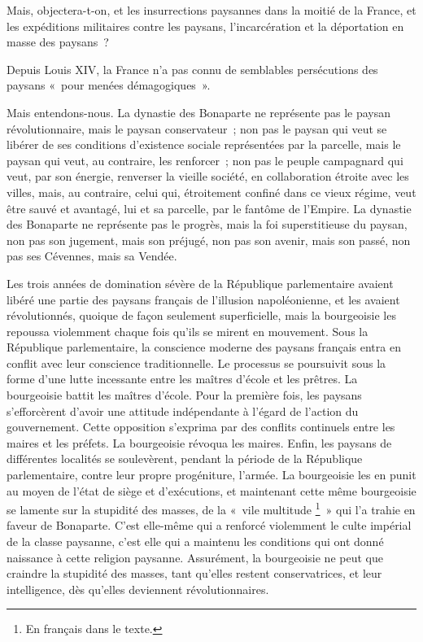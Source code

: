\documentclass[french,twoside]{book} %
\begin{document}
Mais, objectera-t-on, et les insurrections paysannes dans la moitié de la France, et les expéditions militaires contre les paysans, l’incarcération et la déportation en masse des paysans ?\par
Depuis Louis XIV, la France n’a pas connu de semblables persécutions des paysans « pour menées démagogiques ».\par
Mais entendons-nous. La dynastie des Bonaparte ne représente pas le paysan révolutionnaire, mais le paysan conservateur ; non pas le paysan qui veut se libérer de ses conditions d’existence sociale représentées par la parcelle, mais le paysan qui veut, au contraire, les renforcer ; non pas le peuple campagnard qui veut, par son énergie, renverser la vieille société, en collaboration étroite avec les villes, mais, au contraire, celui qui, étroitement confiné dans ce vieux régime, veut être sauvé et avantagé, lui et sa parcelle, par le fantôme de l’Empire. La dynastie des Bonaparte ne représente pas le progrès, mais la foi superstitieuse du paysan, non pas son jugement, mais son préjugé, non pas son avenir, mais son passé, non pas ses Cévennes, mais sa Vendée.\par
Les trois années de domination sévère de la République parlementaire avaient libéré une partie des paysans français de l’illusion napoléonienne, et les avaient révolutionnés, quoique de façon seulement superficielle, mais la bourgeoisie les repoussa violemment chaque fois qu’ils se mirent en mouvement. Sous la République parlementaire, la conscience moderne des paysans français entra en conflit avec leur conscience traditionnelle. Le processus se poursuivit sous la forme d’une lutte incessante entre les maîtres d’école et les prêtres. La bourgeoisie battit les maîtres d’école. Pour la première fois, les paysans s’efforcèrent d’avoir une attitude indépendante à l’égard de l’action du gouvernement. Cette opposition s’exprima par des conflits continuels entre les maires et les préfets. La bourgeoisie révoqua les maires. Enfin, les paysans de différentes localités se soulevèrent, pendant la période de la République parlementaire, contre leur propre progéniture, l’armée. La bourgeoisie les en punit au moyen de l’état de siège et d’exécutions, et maintenant cette même bourgeoisie se lamente sur la stupidité des masses, de la « vile multitude \footnote{En français dans le texte.} » qui l’a trahie en faveur de Bonaparte. C’est elle-même qui a renforcé violemment le culte impérial de la classe paysanne, c’est elle qui a maintenu les conditions qui ont donné naissance à cette religion paysanne. Assurément, la bourgeoisie ne peut que craindre la stupidité des masses, tant qu’elles restent conservatrices, et leur intelligence, dès qu’elles deviennent révolutionnaires.\par
\end{document}
